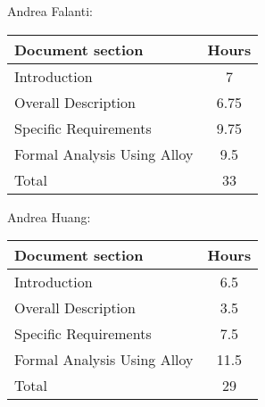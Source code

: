 Andrea Falanti:

\begin{tabular}{|l|c|}
    \hline
    Document section & Hours \\
    \hline
     Introduction & 7\\
     Overall Description & 6.75\\
     Specific Requirements & 9.75\\
     Formal Analysis Using Alloy & 9.5\\
     \hline
     Total & 33\\
     \hline
\end{tabular}
\vskip 0.3in

Andrea Huang:

\begin{tabular}{|l|c|}
    \hline
    Document section & Hours \\
    \hline
     Introduction &  6.5\\
     Overall Description & 3.5\\
     Specific Requirements & 7.5\\
     Formal Analysis Using Alloy & 11.5\\
     \hline
     Total & 29\\
     \hline
\end{tabular}